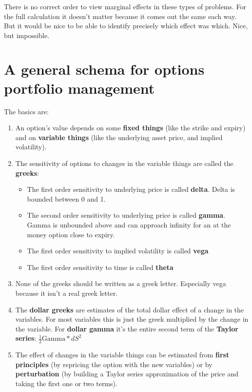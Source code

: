 There is no correct order to view marginal effects in these types of problems. For the full calculation it doesn't matter because it comes out the same each way. But it would be nice to be able to identify precisely which effect was which. Nice, but impossible.


\section{A general schema for options portfolio management}

The basics are:

\begin{enumerate}
\item An option's value depends on some \textbf{fixed things} (like the strike and expiry) and on \textbf{variable things} (like the underlying asset price,  and implied volatility).
\item The sensitivity of options to changes in the variable things are called the \textbf{greeks}:
\begin{itemize}
\item The first order sensitivity to underlying price is called \textbf{delta}. Delta is bounded between 0 and 1.\\
\item The second order sensitivity to underlying price is called \textbf{gamma}. Gamma is unbounded above and can approach infinity for an at the money option close to expiry.\\
\item The first order sensitivity to implied volatility is called \textbf{vega}\\
\item The first order sensitivity to time is called \textbf{theta}\\
\end{itemize} 
\item None of the greeks should be written as a greek letter. Especially vega because it isn't a real greek letter.
\item The \textbf{dollar greeks} are estimates of the total dollar effect of a change in the variables. For most variables this is just the greek multiplied by the change in the variable. For \textbf{dollar gamma} it's the entire second term of the \textbf{Taylor series}: $\frac{1}{2}\mbox{Gamma}*dS^2$\\
\item The effect of changes in the variable things can be estimated from \textbf{first principles} (by repricing the option with the new variables) or by \textbf{perturbation} (by building a Taylor series approximation of the price and taking the first one or two terms).
\end{enumerate}

